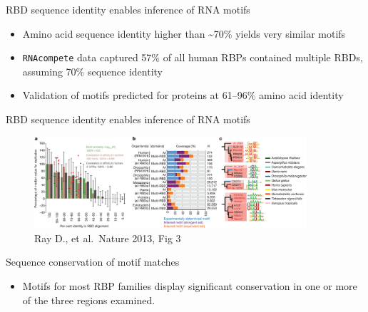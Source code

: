 \documentclass[professionalfont, 12pt, default]{beamer}
\providecommand{\tightlist}{%
    \setlength{\itemsep}{0pt}\setlength{\parskip}{0pt}}
\begin{document}
\begin{frame}[fragile]{%
\protect\hypertarget{rbd-sequence-identity-enables-inference-of-rna-motifs}{%
RBD sequence identity enables inference of RNA motifs}}

\begin{itemize}
\tightlist
\item
  Amino acid sequence identity higher than \textasciitilde{}70\% yields
  very similar motifs
\item
  \texttt{RNAcompete} data captured 57\% of all human RBPs contained
  multiple RBDs, assuming 70\% sequence identity
\item
  Validation of motifs predicted for proteins at 61–96\% amino acid
  identity
\end{itemize}

\end{frame}

\begin{frame}{%
\protect\hypertarget{rbd-sequence-identity-enables-inference-of-rna-motifs-1}{%
RBD sequence identity enables inference of RNA motifs}}

\begin{figure}
\centering
\includegraphics[width=0.9\textwidth,height=\textheight]{img/f3.jpg}
\caption{Ray D., et al.~Nature 2013, Fig 3}
\end{figure}

\end{frame}

\begin{frame}{%
\protect\hypertarget{sequence-conservation-of-motif-matches}{%
Sequence conservation of motif matches}}

\begin{itemize}
\tightlist
\item
  Motifs for most RBP families display significant conservation in one
  or more of the three regions examined.
\end{itemize}

\end{frame}
\end{document}
